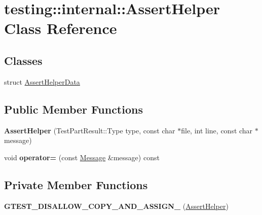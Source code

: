 \hypertarget{classtesting_1_1internal_1_1_assert_helper}{}\section{testing\+:\+:internal\+:\+:Assert\+Helper Class Reference}
\label{classtesting_1_1internal_1_1_assert_helper}
\subsection*{Classes}
\begin{DoxyCompactItemize}
\item 
struct \mbox{\hyperlink{structtesting_1_1internal_1_1_assert_helper_1_1_assert_helper_data}{Assert\+Helper\+Data}}
\end{DoxyCompactItemize}
\subsection*{Public Member Functions}
\begin{DoxyCompactItemize}
\item 
\mbox{\label{classtesting_1_1internal_1_1_assert_helper_ac2c9334518fd4087189b4505567a3c90}} 
{\bfseries Assert\+Helper} (Test\+Part\+Result\+::\+Type type, const char $\ast$file, int line, const char $\ast$message)
\item 
\mbox{\label{classtesting_1_1internal_1_1_assert_helper_a97bf22d786131ab7baa86b97a27aeb4d}} 
void {\bfseries operator=} (const \mbox{\hyperlink{classtesting_1_1_message}{Message}} \&message) const
\end{DoxyCompactItemize}
\subsection*{Private Member Functions}
\begin{DoxyCompactItemize}
\item 
\mbox{\label{classtesting_1_1internal_1_1_assert_helper_a264544ac41950b296c34253d2e656b10}} 
{\bfseries G\+T\+E\+S\+T\+\_\+\+D\+I\+S\+A\+L\+L\+O\+W\+\_\+\+C\+O\+P\+Y\+\_\+\+A\+N\+D\+\_\+\+A\+S\+S\+I\+G\+N\+\_\+} (\mbox{\hyperlink{classtesting_1_1internal_1_1_assert_helper}{Assert\+Helper}})
\end{DoxyCompactItemize}

